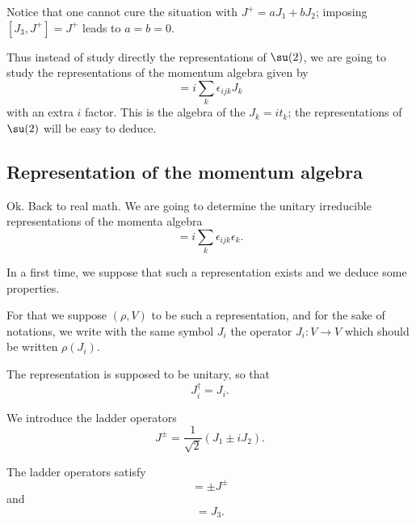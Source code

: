 Notice that one cannot cure the situation with \( J^+=aJ_1+bJ_2\); imposing \( [J_3,J^+]=J^+\) leads to \( a=b=0\).

Thus instead of study directly the representations of \( \su(2)\), we are going to study the representations of the momentum algebra given by
\begin{equation}
    [J_i,J_j]=i\sum_k\epsilon_{ijk}J_k
\end{equation}
with an extra \( i\) factor. This is the algebra of the \( J_k=it_k\); the representations of \( \su(2)\) will be easy to deduce.

\subsection{Representation of the momentum algebra}

Ok. Back to real math. We are going to determine the unitary irreducible representations of the momenta algebra
\begin{equation}
    [J_i,J_j]=i\sum_k\epsilon_{ijk}\epsilon_k.
\end{equation}

In a first time, we suppose that such a representation exists and we deduce some properties.

For that we suppose \( (\rho, V)\) to be such a representation, and for the sake of notations, we write with the same symbol \( J_i\) the operator \( J_i\colon V\to V\) which should be written \( \rho(J_i)\).

The representation is supposed to be unitary, so that
\begin{equation}
    J_i^{\dag}=J_i.
\end{equation}

We introduce the ladder operators
\begin{equation}
    J^{\pm}=\frac{1}{ \sqrt{ 2 } }(J_1\pm iJ_2).
\end{equation}

\begin{lemma}
    The ladder operators satisfy
    \begin{equation}
        [J_3,J^{\pm}]=\pm J^{\pm}
    \end{equation}
    and
    \begin{equation}
        [J^+,J^-]=J_3.
    \end{equation}
\end{lemma}

